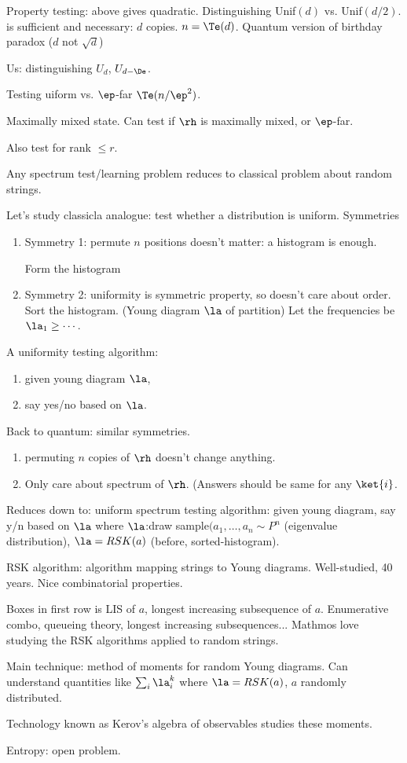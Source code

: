 Property testing: above gives quadratic. Distinguishing Unif$(d)$ vs. Unif$(d/2)$. is sufficient and necessary: $d$ copies. $n=\Te(d)$. Quantum version of birthday paradox ($d$ not $\sqrt d$)

Us: distinguishing $U_d$, $U_{d-\De}$. %

Testing uiform  vs. $\ep$-far $\Te(n/\ep^2)$. 

Maximally mixed state. Can test if $\rh$ is maximally mixed, or $\ep$-far. 

Also test for rank $\le r$.

Any spectrum test/learning problem reduces to classical problem about random strings.

Let's study classicla analogue: test whether a distribution is uniform.
Symmetries
\begin{enumerate}
\item
Symmetry 1: permute $n$ positions doesn't matter: a histogram is enough.

Form the histogram
\item
Symmetry 2: uniformity is symmetric property, so doesn't care about order. Sort the histogram. (Young diagram $\la$ of partition) Let the frequencies be $\la_1\ge\cdots$.
\end{enumerate}

A uniformity testing algorithm:
\begin{enumerate}
\item
given young diagram $\la$,
\item
say yes/no based on $\la$.
\end{enumerate}

Back to quantum: similar symmetries. 
\begin{enumerate}
\item
permuting $n$ copies of $\rh$ doesn't change anything.
\item
Only care about spectrum of $\rh$. (Answers should be same for any $\ket{i}$. 
\end{enumerate}
Reduces down to:
uniform spectrum testing algorithm: given young diagram, say y/n based on $\la$ where $\la$:draw sample$(a_1,\ldots, a_n\sim P^n$ (eigenvalue distribution), $\la=RSK(a)$ (before, sorted-histogram). 

RSK algorithm: algorithm mapping strings to Young diagrams. Well-studied, 40 years. Nice combinatorial properties. 

Boxes in first row is LIS of $a$, longest increasing subsequence of $a$. Enumerative combo, queueing theory, longest increasing subsequences...
 Mathmos love studying the RSK algorithms applied to random strings.

Main technique: method of moments for random Young diagrams. Can understand quantities like $\sum_i\la_i^k$ where $\la=RSK(a)$, $a$ randomly distributed.

Technology known as Kerov's algebra of observables studies these moments. 

Entropy: open problem.